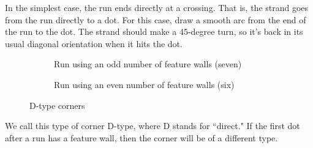 \documentclass[openany]{book}
\begin{document}
In the simplest case, the run ends directly at a crossing. That is, the strand goes from the run directly to a dot. For this case, draw a smooth arc from the end of the run to the dot. The strand should make a 45-degree turn, so it's back in its usual diagonal orientation when it hits the dot.

\begin{figure}[H]
\begin{subfigure}[t]{.49\textwidth}
		\centering
{}
\caption{Run using an odd number of feature walls (seven)}
\end{subfigure}
\qquad
\begin{subfigure}[t]{.49\textwidth}
		\centering
{}
\caption{Run using an even number of feature walls (six)}
\end{subfigure}
\caption{D-type corners}\label{fig:featurerun}
\end{figure}

We call this type of corner D-type, where D stands for ``direct." If the first dot after a run has
a feature wall, then the corner will be of a different type.

\medskip
\end{document}

